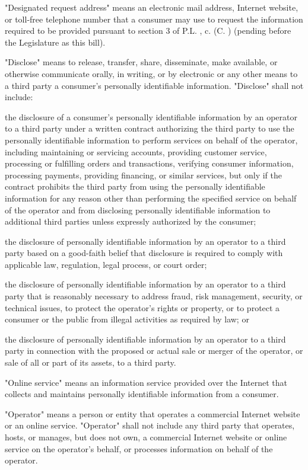     "Designated request address" means an electronic mail address, Internet website, or toll-free telephone number that a consumer may use to request the information required to be provided pursuant to section 3 of P.L.    , c.    (C.      ) (pending before the Legislature as this bill).

     "Disclose" means to release, transfer, share, disseminate, make available, or otherwise communicate orally, in writing, or by electronic or any other means to a third party a consumer's personally identifiable information. "Disclose" shall not include:

     the disclosure of a consumer's personally identifiable information by an operator to a third party under a written contract authorizing the third party to use the personally identifiable information to perform services on behalf of the operator, including maintaining or servicing accounts, providing customer service, processing or fulfilling orders and transactions, verifying consumer information, processing payments, providing financing, or similar services, but only if the contract prohibits the third party from using the personally identifiable information for any reason other than performing the specified service on behalf of the operator and from disclosing personally identifiable information to additional third parties unless expressly authorized by the consumer;

     the disclosure of personally identifiable information by an operator to a third party based on a good-faith belief that disclosure is required to comply with applicable law, regulation, legal process, or court order;

     the disclosure of personally identifiable information by an operator to a third party that is reasonably necessary to address fraud, risk management, security, or technical issues, to protect the operator's rights or property, or to protect a consumer or the public from illegal activities as required by law; or

     the disclosure of personally identifiable information by an operator to a third party in connection with the proposed or actual sale or merger of the operator, or sale of all or part of its assets, to a third party.

     "Online service" means an information service provided over the Internet that collects and maintains personally identifiable information from a consumer.

     "Operator" means a person or entity that operates a commercial Internet website or an online service. "Operator" shall not include any third party that operates, hosts, or manages, but does not own, a commercial Internet website or online service on the operator's behalf, or processes information on behalf of the operator.

